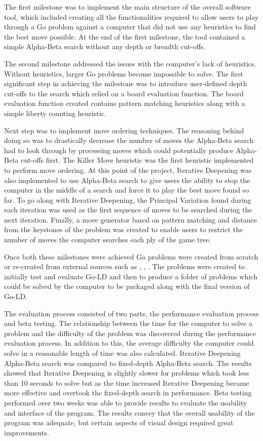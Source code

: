 \documentclass{l4proj}
\begin{document}
The first milestone was to implement the main structure of the overall software tool, which included creating all the functionalities required to allow users to play through a Go problem against a computer that did not use any heuristics to find the best move possible. At the end of the first milestone, the tool contained a simple Alpha-Beta search without any depth or breadth cut-offs.

The second milestone addressed the issues with the computer’s lack of heuristics. Without heuristics, larger Go problems become impossible to solve. The first significant step in achieving the milestone was to introduce user-defined depth cut-offs to the search which relied on a board evaluation function. The board evaluation function created contains pattern matching heuristics along with a simple liberty counting heuristic.

Next step was to implement move ordering techniques. The reasoning behind doing so was to drastically decrease the number of moves the Alpha-Beta search had to look through by processing moves which could potentially produce Alpha-Beta cut-offs first. The Killer Move heuristic was the first heuristic implemented to perform move ordering. At this point of the project, Iterative Deepening was also implemented to use Alpha-Beta search to give users the ability to stop the computer in the middle of a search and force it to play the best move found so far. To go along with Iterative Deepening, the Principal Variation found during each iteration was used as the first sequence of moves to be searched during the next iteration. Finally, a move generator based on pattern matching and distance from the keystones of the problem was created to enable users to restrict the number of moves the computer searches each ply of the game tree.






Once both these milestones were achieved Go problems were created from scratch or re-created from external sources such as \cite{Cho1993}, \cite{Davies1975}, \cite{GoProblems}. The problems were created to initially test and evaluate Go-LD and then to produce a folder of problems which could be solved by the computer to be packaged along with the final version of Go-LD.

The evaluation process consisted of two parts, the performance evaluation process and beta testing. The relationship between the time for the computer to solve a problem and the difficulty of the problem was discovered during the performance evaluation process. In addition to this, the average difficulty the computer could solve in a reasonable length of time was also calculated. Iterative Deepening Alpha-Beta search was compared to fixed-depth Alpha-Beta search. The results showed that Iterative Deepening is slightly slower for problems which took less than 10 seconds to solve but as the time increased Iterative Deepening became more effective and overtook the fixed-depth search in performance. Beta testing performed over two weeks was able to provide results to evaluate the usability and interface of the program. The results convey that the overall usability of the program was adequate, but certain aspects of visual design required great improvements.
\end{document}
